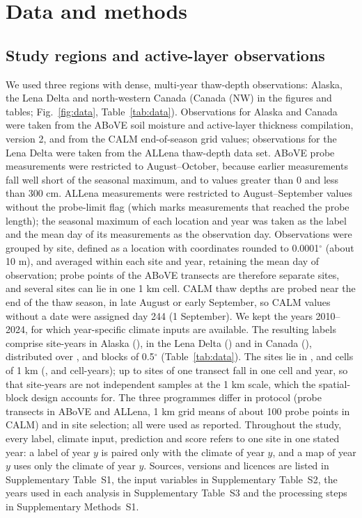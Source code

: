 \section{Data and methods}\label{sec:methods}

\subsection{Study regions and active-layer observations}
We used three regions with dense, multi-year thaw-depth observations: Alaska, the Lena Delta and north-western Canada (Canada (NW) in the figures and tables; Fig.~\ref{fig:data}, Table~\ref{tab:data}). Observations for Alaska and Canada were taken from the ABoVE soil moisture and active-layer thickness compilation, version 2\cite{Moore2025}, and from the CALM end-of-season grid values\cite{Streletskiy2025}; observations for the Lena Delta were taken from the ALLena thaw-depth data set\cite{Veremeeva2025}. ABoVE probe measurements were restricted to August--October, because earlier measurements fall well short of the seasonal maximum, and to values greater than 0 and less than 300 cm. ALLena measurements were restricted to August--September values without the probe-limit flag (which marks measurements that reached the probe length); the seasonal maximum of each location and year was taken as the label and the mean day of its measurements as the observation day. Observations were grouped by site, defined as a location with coordinates rounded to 0.0001$^\circ$ (about 10 m), and averaged within each site and year, retaining the mean day of observation; probe points of the ABoVE transects are therefore separate sites, and several sites can lie in one 1 km cell. CALM thaw depths are probed near the end of the thaw season, in late August or early September\cite{Nelson1997,Brown2000}, so CALM values without a date were assigned day 244 (1 September). We kept the years 2010--2024, for which year-specific climate inputs are available. The resulting labels comprise \nncyAk{} site-years in Alaska (\nyrsAk), \nncyLe{} in the Lena Delta (\nyrsLe) and \nncyCa{} in Canada (\nyrsCa), distributed over \nnblkAk, \nnblkLe{} and \nnblkCa{} blocks of 0.5$^\circ$ (Table~\ref{tab:data}). The sites lie in \nnkmcellAk, \nnkmcellLe{} and \nnkmcellCa{} cells of 1 km (\nnkmcyAk, \nnkmcyLe{} and \nnkmcyCa{} cell-years); up to \nnkmmaxAk{} sites of one transect fall in one cell and year, so that site-years are not independent samples at the 1 km scale, which the spatial-block design accounts for. The three programmes differ in protocol (probe transects in ABoVE and ALLena, 1 km grid means of about 100 probe points in CALM) and in site selection; all were used as reported. Throughout the study, every label, climate input, prediction and score refers to one site in one stated year: a label of year $y$ is paired only with the climate of year $y$, and a map of year $y$ uses only the climate of year $y$. Sources, versions and licences are listed in Supplementary Table~S1, the input variables in Supplementary Table~S2, the years used in each analysis in Supplementary Table~S3 and the processing steps in Supplementary Methods~S1.

